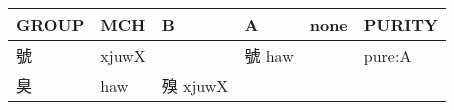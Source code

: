 \documentclass[14pt,a4paper]{scrartcl}
\begin{document}
\begin{longtable}[c]{@{}llllll@{}}
\toprule
\begin{minipage}[b]{0.14\columnwidth}\raggedright\strut
GROUP
\strut\end{minipage} &
\begin{minipage}[b]{0.14\columnwidth}\raggedright\strut
MCH
\strut\end{minipage} &
\begin{minipage}[b]{0.14\columnwidth}\raggedright\strut
B
\strut\end{minipage} &
\begin{minipage}[b]{0.14\columnwidth}\raggedright\strut
A
\strut\end{minipage} &
\begin{minipage}[b]{0.14\columnwidth}\raggedright\strut
none
\strut\end{minipage} &
\begin{minipage}[b]{0.14\columnwidth}\raggedright\strut
PURITY
\strut\end{minipage}\tabularnewline
\midrule
\endhead
\begin{minipage}[t]{0.14\columnwidth}\raggedright\strut
號
\strut\end{minipage} &
\begin{minipage}[t]{0.14\columnwidth}\raggedright\strut
xjuwX
\strut\end{minipage} &
\begin{minipage}[t]{0.14\columnwidth}\raggedright\strut
\strut\end{minipage} &
\begin{minipage}[t]{0.14\columnwidth}\raggedright\strut
號 haw
\strut\end{minipage} &
\begin{minipage}[t]{0.14\columnwidth}\raggedright\strut
\strut\end{minipage} &
\begin{minipage}[t]{0.14\columnwidth}\raggedright\strut
pure:A
\strut\end{minipage}\tabularnewline
\begin{minipage}[t]{0.14\columnwidth}\raggedright\strut
臭
\strut\end{minipage} &
\begin{minipage}[t]{0.14\columnwidth}\raggedright\strut
haw
\strut\end{minipage} &
\begin{minipage}[t]{0.14\columnwidth}\raggedright\strut
殠 xjuwX
\strut\end{minipage} &
\begin{minipage}[t]{0.14\columnwidth}\raggedright\strut

\end{minipage}
\end{longtable}
\end{document}
